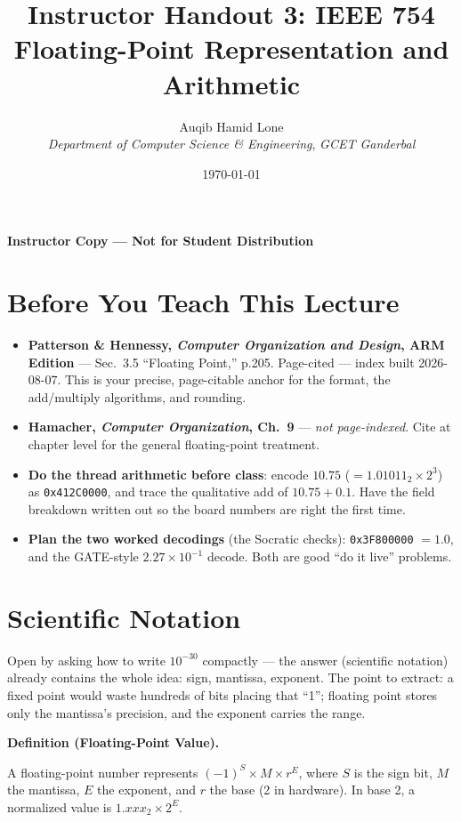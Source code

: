 \documentclass[11pt]{article}
\title{Instructor Handout 3: IEEE 754 Floating-Point Representation and Arithmetic}
\author{Auqib Hamid Lone\\[0.3em]
  \emph{Department of Computer Science \& Engineering}, \emph{GCET Ganderbal}}
\date{\today}
\newenvironment{definitionbox}[1]{%
  \par\noindent\textbf{Definition (#1).}\ \itshape
}{\par\vspace{0.3em}}
\begin{document}
\maketitle
{\centering\large\color{negative}\textbf{Instructor Copy --- Not for Student Distribution}\par}
\vspace{0.5cm}

\section{Before You Teach This Lecture}

\begin{itemize}
  \item \textbf{Patterson \& Hennessy, \textit{Computer Organization and Design}, ARM Edition} --- Sec.~3.5 ``Floating Point,'' p.205. Page-cited --- index built 2026-08-07. This is your precise, page-citable anchor for the format, the add/multiply algorithms, and rounding.
  \item \textbf{Hamacher, \textit{Computer Organization}, Ch.~9} --- \emph{not page-indexed}. Cite at chapter level for the general floating-point treatment.
  \item \textbf{Do the thread arithmetic before class}: encode $10.75$ ($= 1.01011_2 \times 2^3$) as \texttt{0x412C0000}, and trace the qualitative add of $10.75 + 0.1$. Have the field breakdown written out so the board numbers are right the first time.
  \item \textbf{Plan the two worked decodings} (the Socratic checks): \texttt{0x3F800000} $= 1.0$, and the GATE-style $2.27\times10^{-1}$ decode. Both are good ``do it live'' problems.
\end{itemize}

\section{Scientific Notation}

Open by asking how to write $10^{-30}$ compactly --- the answer (scientific notation) already contains the whole idea: sign, mantissa, exponent. The point to extract: a fixed point would waste hundreds of bits placing that ``1''; floating point stores only the mantissa's precision, and the exponent carries the range.

\begin{definitionbox}{Floating-Point Value}
A floating-point number represents $(-1)^S \times M \times r^E$, where $S$ is the sign bit, $M$ the mantissa, $E$ the exponent, and $r$ the base (2 in hardware). In base 2, a normalized value is $1.xxx_2 \times 2^E$.
\end{definitionbox}
\end{document}
